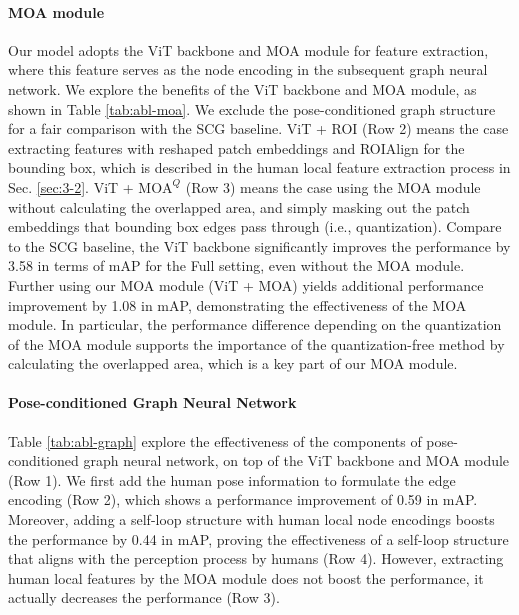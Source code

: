 \documentclass[10pt,twocolumn,letterpaper]{article}
\begin{document}
\paragraph{MOA module} Our model adopts the ViT backbone and MOA module for feature extraction, where this feature serves as the node encoding in the subsequent graph neural network. We explore the benefits of the ViT backbone and MOA module, as shown in Table \ref{tab:abl-moa}. We exclude the pose-conditioned graph structure for a fair comparison with the SCG baseline. ViT + ROI (Row 2) means the case extracting features with reshaped patch embeddings and ROIAlign for the bounding box, which is described in the human local feature extraction process in Sec. \ref{sec:3-2}. ViT + $\textrm{MOA}^{Q}$ (Row 3) means the case using the MOA module without calculating the overlapped area, and simply masking out the patch embeddings that bounding box edges pass through (i.e., quantization). Compare to the SCG baseline, the ViT backbone significantly improves the performance by 3.58 in terms of mAP for the Full setting, even without the MOA module. Further using our MOA module (ViT + MOA) yields additional performance improvement by 1.08 in mAP, demonstrating the effectiveness of the MOA module. In particular, the performance difference depending on the quantization of the MOA module supports the importance of the quantization-free method by calculating the overlapped area, which is a key part of our MOA module.

\paragraph{Pose-conditioned Graph Neural Network}
Table \ref{tab:abl-graph} explore the effectiveness of the components of pose-conditioned graph neural network, on top of the ViT backbone and MOA module (Row 1). We first add the human pose information to formulate the edge encoding (Row 2), which shows a performance improvement of 0.59 in mAP. Moreover, adding a self-loop structure with human local node encodings boosts the performance by 0.44 in mAP, proving the effectiveness of a self-loop structure that aligns with the perception process by humans (Row 4). However, extracting human local features by the MOA module does not boost the performance, it actually decreases the performance (Row 3). 
\end{document}
